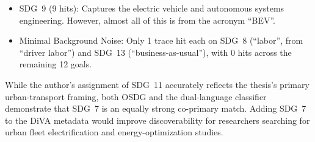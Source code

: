 \begin{casestudySection}
\begin{itemize}
    \item \gls{SDG}~9 (9 hits): Captures the electric vehicle and autonomous systems engineering. However, almost all of this is from the acronym \enquote{BEV}.
    
    \item Minimal Background Noise: Only \num{1} trace hit each on \gls{SDG}~8 (\enquote{labor}, from \enquote{driver labor}) and \gls{SDG}~13 (\enquote{business-as-usual}), with \num{0} hits across the remaining \num{12} goals.
\end{itemize}
\end{casestudySection}

\begin{takeaway}
While the author's assignment of \gls{SDG}~11 accurately reflects the thesis's primary urban-transport framing, both OSDG and the dual-language classifier demonstrate that \gls{SDG}~7 is an equally strong co-primary match. Adding \gls{SDG}~7 to the \gls{DiVA} metadata would improve discoverability for researchers searching for urban fleet electrification and energy-optimization studies.
\end{takeaway}

